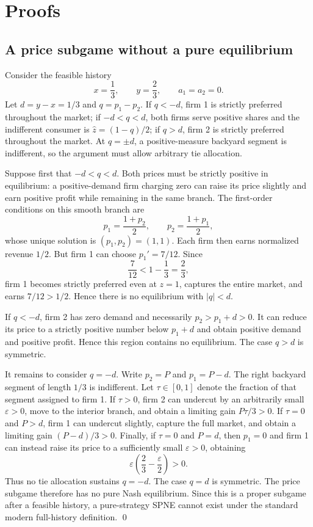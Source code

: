\appendix
\section{Proofs}\label{app:proofs}

\subsection{A price subgame without a pure equilibrium}\label{app:no-price-ne}

Consider the feasible history
\[
 x=\frac13,\qquad y=\frac23,\qquad a_1=a_2=0.
\]
Let $d=y-x=1/3$ and $q=p_1-p_2$. If $q<-d$, firm 1 is strictly preferred throughout the market; if $-d<q<d$, both firms serve positive shares and the indifferent consumer is $\hat z=(1-q)/2$; if $q>d$, firm 2 is strictly preferred throughout the market. At $q=\pm d$, a positive-measure backyard segment is indifferent, so the argument must allow arbitrary tie allocation.

Suppose first that $-d<q<d$. Both prices must be strictly positive in equilibrium: a positive-demand firm charging zero can raise its price slightly and earn positive profit while remaining in the same branch. The first-order conditions on this smooth branch are
\[
 p_1=\frac{1+p_2}{2},
 \qquad
 p_2=\frac{1+p_1}{2},
\]
whose unique solution is $(p_1,p_2)=(1,1)$. Each firm then earns normalized revenue $1/2$. But firm 1 can choose $p_1'=7/12$. Since
\[
 \frac7{12}<1-\frac13=\frac23,
\]
firm 1 becomes strictly preferred even at $z=1$, captures the entire market, and earns $7/12>1/2$. Hence there is no equilibrium with $|q|<d$.

If $q<-d$, firm 2 has zero demand and necessarily $p_2>p_1+d>0$. It can reduce its price to a strictly positive number below $p_1+d$ and obtain positive demand and positive profit. Hence this region contains no equilibrium. The case $q>d$ is symmetric.

It remains to consider $q=-d$. Write $p_2=P$ and $p_1=P-d$. The right backyard segment of length $1/3$ is indifferent. Let $\tau\in[0,1]$ denote the fraction of that segment assigned to firm 1. If $\tau>0$, firm 2 can undercut by an arbitrarily small $\varepsilon>0$, move to the interior branch, and obtain a limiting gain $P\tau/3>0$. If $\tau=0$ and $P>d$, firm 1 can undercut slightly, capture the full market, and obtain a limiting gain $(P-d)/3>0$. Finally, if $\tau=0$ and $P=d$, then $p_1=0$ and firm 1 can instead raise its price to a sufficiently small $\varepsilon>0$, obtaining
\[
 \varepsilon\left(\frac23-\frac{\varepsilon}{2}\right)>0.
\]
Thus no tie allocation sustains $q=-d$. The case $q=d$ is symmetric. The price subgame therefore has no pure Nash equilibrium. Since this is a proper subgame after a feasible history, a pure-strategy SPNE cannot exist under the standard modern full-history definition. \qed

